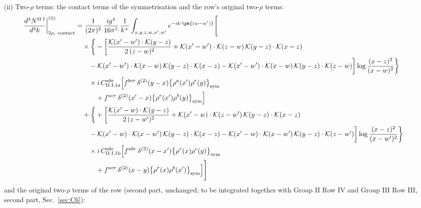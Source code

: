 (ii) Two-$\rho$ terms: the contact terms of the symmetrisation and the row's original two-$\rho$ terms:
\begin{align}
\frac{d^{3}N^{\rm II.I}}{d^{3}k}\bigg|^{\rm (ii)}_{2\rho,\ {\rm contact}}&=\frac{1}{(2\pi)^{3}}\,\frac{ig^{4}}{16\pi^{5}}\,\frac{1}{k^{+}}\int_{x,y,z,w,x',w'}e^{-ik\cdot\ph{(w-w')}}\Bigg[\notag\\
&\quad\times\bigg\{-\bigg[\frac{\mathcal{K}(x'-w')\cdot\mathcal{K}(y-z)}{2\,(z-w)^{2}}+\mathcal{K}(x'-w')\cdot\mathcal{K}(z-w)\,\mathcal{K}(y-z)\cdot\mathcal{K}(x-z)\notag\\
&\qquad-\mathcal{K}(x'-w')\cdot\mathcal{K}(x-w)\,\mathcal{K}(y-z)\cdot\mathcal{K}(x-z)-\mathcal{K}(x'-w')\cdot\mathcal{K}(x-w)\,\mathcal{K}(y-z)\cdot\mathcal{K}(z-w)\bigg]\log\frac{(x-z)^{2}}{(x-w)^{2}}\bigg\}\notag\\
&\qquad\times i\,C^{abc}_{{\rm II.I,1a}}\Big[f^{bcr}\,\delta^{(2)}(y-x)\big\{\rho^{a}(x')\rho^{r}(y)\big\}_{\rm sym}\notag\\
&\qquad\quad +f^{acr}\,\delta^{(2)}(x'-x)\big\{\rho^{r}(x')\rho^{b}(y)\big\}_{\rm sym}\Big]\notag\\
&\quad+\bigg\{+\bigg[\frac{\mathcal{K}(x'-w)\cdot\mathcal{K}(y-z)}{2\,(z-w')^{2}}+\mathcal{K}(x'-w)\cdot\mathcal{K}(z-w')\,\mathcal{K}(y-z)\cdot\mathcal{K}(x-z)\notag\\
&\qquad-\mathcal{K}(x'-w)\cdot\mathcal{K}(x-w')\,\mathcal{K}(y-z)\cdot\mathcal{K}(x-z)-\mathcal{K}(x'-w)\cdot\mathcal{K}(x-w')\,\mathcal{K}(y-z)\cdot\mathcal{K}(z-w')\bigg]\log\frac{(x-z)^{2}}{(x-w')^{2}}\bigg\}\notag\\
&\qquad\times i\,C^{abc}_{{\rm II.I,1b}}\Big[f^{abr}\,\delta^{(2)}(x-x')\big\{\rho^{r}(x)\rho^{c}(y)\big\}_{\rm sym}\notag\\
&\qquad\quad +f^{acr}\,\delta^{(2)}(x-y)\big\{\rho^{r}(x)\rho^{b}(x')\big\}_{\rm sym}\Big]\Bigg]\label{eq:D-II.I-2}
\end{align}
and the original two-$\rho$ terms of the row (second part, unchanged; to be integrated together with Group II Row IV and Group III Row III, second part, Sec.~\ref{sec:C6}):
